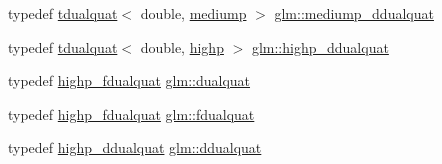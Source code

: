 \begin{DoxyCompactItemize}
\item 
typedef \mbox{\hyperlink{structglm_1_1tdualquat}{tdualquat}}$<$ double, \mbox{\hyperlink{namespaceglm_a0f04f086094c747d227af4425893f545a6416f3ea0c9025fb21ed50c4d6620482}{mediump}} $>$ \mbox{\hyperlink{group__gtx__dual__quaternion_ga5727116ab20b2a1d40387766d723dd6c}{glm\+::mediump\+\_\+ddualquat}}
\item 
typedef \mbox{\hyperlink{structglm_1_1tdualquat}{tdualquat}}$<$ double, \mbox{\hyperlink{namespaceglm_a0f04f086094c747d227af4425893f545ac6f7eab42eacbb10d59a58e95e362074}{highp}} $>$ \mbox{\hyperlink{group__gtx__dual__quaternion_ga83e4c5d27c8b0a264a3f3aed24f3f84e}{glm\+::highp\+\_\+ddualquat}}
\item 
typedef \mbox{\hyperlink{group__gtx__dual__quaternion_ga8c46d61c38b2b6d9c5091c667dd20fe8}{highp\+\_\+fdualquat}} \mbox{\hyperlink{group__gtx__dual__quaternion_ga2f6227b5f9dc08a2e7682065a84b3aa9}{glm\+::dualquat}}
\item 
typedef \mbox{\hyperlink{group__gtx__dual__quaternion_ga8c46d61c38b2b6d9c5091c667dd20fe8}{highp\+\_\+fdualquat}} \mbox{\hyperlink{group__gtx__dual__quaternion_ga436906129bc69ca5059555cafcbac9fd}{glm\+::fdualquat}}
\item 
typedef \mbox{\hyperlink{group__gtx__dual__quaternion_ga83e4c5d27c8b0a264a3f3aed24f3f84e}{highp\+\_\+ddualquat}} \mbox{\hyperlink{group__gtx__dual__quaternion_ga373431ffdd82d5c03c258217a9e1f1a6}{glm\+::ddualquat}}
\end{DoxyCompactItemize}
